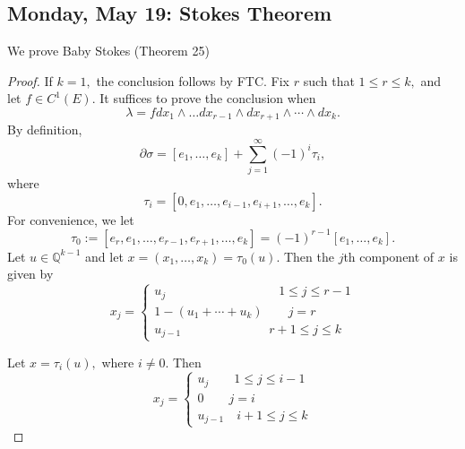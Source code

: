 \documentclass[10pt, oneside]{article}
\newcommand{\bbQ}{\mathbb{Q}}
\theoremstyle{definition}
\begin{document}
\subsection{Monday, May 19: Stokes Theorem}
We prove Baby Stokes (Theorem 25)
\begin{proof}
    If $k =1 ,$ the conclusion follows by FTC. Fix $r$ such that $1\leq r \leq k,$ and let $f \in C^1(E).$ It suffices to prove the conclusion when 
    \[\lambda = f dx_1 \wedge \dots dx_{r-1}\wedge dx_{r+1}\wedge \cdots \wedge dx_k.\] By definition, 
    \[\partial \sigma = [e_1, \dots, e_k] + \sum_{j=1}^\infty (-1)^i \tau_i,\] where 
    \[\tau_i = [0,e_1, \dots, e_{i-1}, e_{i+1}, \dots, e_k].\] For convenience, we let 
    \[\tau_0:= [e_r, e_1, \dots, e_{r-1}, e_{r +1}, \dots, e_k]  = (-1)^{r-1}[e_1, \dots, e_k].\] Let $u\in \bbQ^{k-1}$ and let $x = (x_1, \dots, x_k) = \tau_0(u).$ Then the $j$th component of $x$ is given by
    \[x_j  = \begin{cases}
        u_j \qquad \qquad \qquad \quad \qquad  1\leq j \leq r-1\\
        1-(u_1 + \cdots + u_k) \qquad j = r\\
        u_{j-1}\qquad \quad \qquad \qquad r + 1 \leq j \leq k
    \end{cases}\]

    Let $x = \tau_i(u),$ where $i \neq 0.$ Then 
        \[x_j  = \begin{cases}
        u_j \qquad  1\leq j \leq i-1\\
        0 \qquad j = i\\
        u_{j-1} \quad i + 1 \leq j \leq k
    \end{cases}\]


\end{proof}
\end{document}
